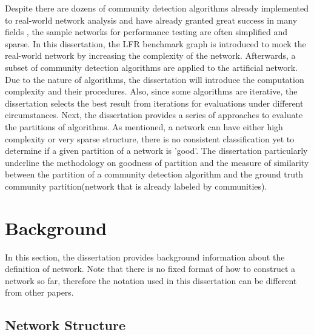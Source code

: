 \documentclass[12pt]{article}
\begin{document}
Despite there are dozens of community detection algorithms already implemented to real-world network analysis and have already granted great success in many fields \cite{2,3}, the sample networks for performance testing are often simplified and sparse. In this dissertation, the LFR benchmark graph is introduced to mock the real-world network by increasing the complexity of the network. Afterwards, a subset of community detection algorithms are applied to the artificial network. Due to the nature of algorithms, the dissertation will introduce the computation complexity and their procedures. Also, since some algorithms are iterative, the dissertation selects the best result from iterations for evaluations under different circumstances. Next, the dissertation provides a series of approaches to evaluate the partitions of algorithms. As mentioned, a network can have either high complexity or very sparse structure, there is no consistent classification yet to determine if a given partition of a network is 'good'. The dissertation particularly underline the methodology on goodness of partition and the measure of similarity between the partition of a community detection algorithm and the ground truth community partition(network that is already labeled by communities).

\section{Background}
In this section, the dissertation provides background information about the definition of network. Note that there is no fixed format of how to construct a network so far, therefore the notation used in this dissertation can be different from other papers.

\subsection{Network Structure}
\end{document}
